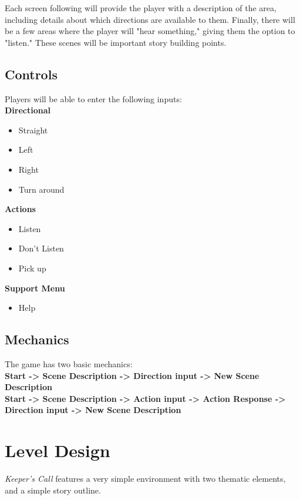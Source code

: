 \documentclass[letterpaper, twoside, 12pt]{memoir}
\begin{document}
Each screen following will provide the player with a description of the area, including details about which directions are available to them. Finally, there will be a few areas where the player will "hear something," giving them the option to "listen." These scenes will be important story building points. 

\section{Controls}

Players will be able to enter the following inputs:
\\

\textbf{Directional}
\begin{itemize}
	\item Straight
	\item Left
	\item Right
	\item Turn around \\
\end{itemize} 

\textbf{Actions}
\begin{itemize}
	\item Listen
	\item Don't Listen
	\item Pick up \\
\end{itemize} 

\textbf{Support Menu}
\begin{itemize}
	\item Help
\end{itemize}

\section{Mechanics}
The game has two basic mechanics: \\

\textbf{Start -> Scene Description -> Direction input -> New Scene Description} \\

\textbf{Start -> Scene Description -> Action input -> Action Response -> Direction input -> New Scene Description}

\chapter{Level Design}

\textit{Keeper's Call} features a very simple environment with two thematic elements, and a simple story outline.
\end{document}
